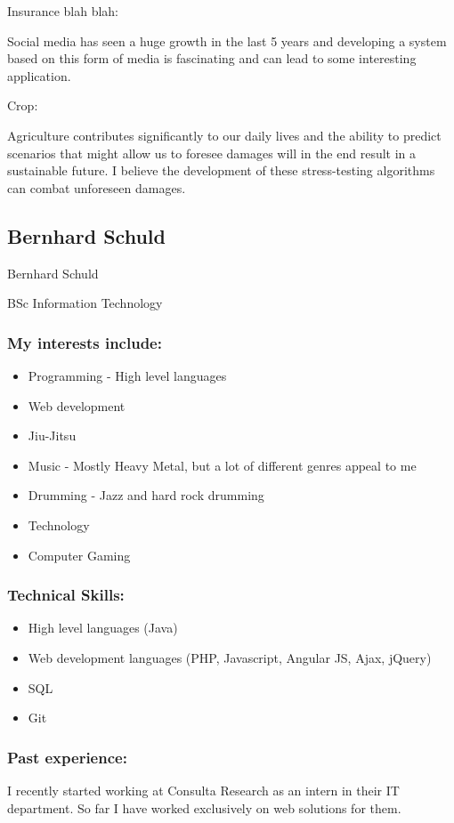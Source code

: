 \documentclass{article}
\begin{document}
	Insurance blah blah:
	
	Social media has seen a huge growth in the last 5 years and developing a system based on this form of media is fascinating and can lead to some interesting application.
	
	Crop:
	
	Agriculture contributes significantly to our daily lives and the ability to predict scenarios that might allow us to foresee damages will in the end result in a sustainable future. I believe the development of these stress-testing algorithms can combat unforeseen damages.
	
	
	
	\subsection{Bernhard Schuld}
	Bernhard Schuld 
	
	BSc Information Technology
	\subsubsection{My interests include:}
	\begin{itemize}
		\item Programming - High level languages
		\item Web development
		\item Jiu-Jitsu
		\item Music - Mostly Heavy Metal, but a lot of different genres appeal to me
		\item Drumming - Jazz and hard rock drumming
		\item Technology
		\item Computer Gaming		
	\end{itemize}
	\subsubsection{Technical Skills:}
	\begin{itemize}
		\item High level languages (Java)
		\item Web development languages (PHP, Javascript, Angular JS, Ajax, jQuery)
		\item SQL
		\item Git
	\end{itemize}
	\subsubsection{Past experience:}
		I recently started working at Consulta Research as an intern in their IT department. So far I have worked exclusively on web solutions for them.
\end{document}
